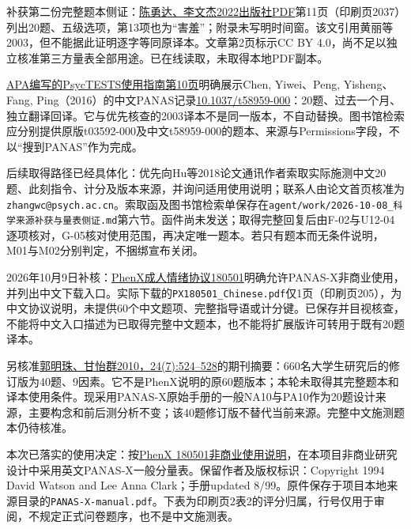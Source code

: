 \documentclass[11pt,a4paper]{article}
\begin{document}
补获第二份完整题本侧证：\href{https://pdf.hanspub.org/ap20220600000_21602996.pdf}{陈勇达、李文杰2022出版社PDF}第11页（印刷页2037）列出20题、五级选项，第13项也为“害羞”；附录未写明时间窗。该文引用黄丽等2003，但不能据此证明逐字等同原译本。文章第2页标示CC BY 4.0，尚不足以独立核准第三方量表全部用途。已在线读取，未取得本地PDF副本。

\href{https://fieldinglibrary.wordpress.com/wp-content/uploads/2014/09/psyctests-on-psycnet.pdf}{APA编写的PsycTESTS使用指南第10页}明确展示Chen, Yiwei、Peng, Yisheng、Fang, Ping（2016）的中文PANAS记录\href{https://doi.org/10.1037/t58959-000}{10.1037/t58959-000}：20题、过去一个月、独立翻译回译。它与优先核查的2003译本不是同一版本，不自动替换。图书馆检索应分别提供原版t03592-000及中文t58959-000的题本、来源与Permissions字段，不以“搜到PANAS”作为完成。

后续取得路径已经具体化：优先向Hu等2018论文通讯作者索取实际施测中文20题、此刻指令、计分及版本来源，并询问适用使用说明；联系人由论文首页核准为\texttt{zhangwc@psych.ac.cn}。索取函及图书馆检索单保存在\texttt{agent/work/2026-10-08\_科学来源补获与量表侧证.md}第六节。函件尚未发送；取得完整回复后由F-02与U12-04逐项核对，G-05核对使用范围，再决定唯一题本。若只有题本而无条件说明，M01与M02分别判定，不捆绑宣布关闭。

2026年10月9日补核：\href{https://www.phenxtoolkit.org/protocols/view/180501}{PhenX成人情绪协议180501}明确允许PANAS-X非商业使用，并列出中文下载入口。实际下载的\texttt{PX180501\_Chinese.pdf}仅1页（印刷页205），为中文协议说明，未提供60个中文题项、完整指导语或计分键。已保存并目视核查，不能将中文入口描述为已取得完整中文题本，也不能将扩展版许可转用于既有20题译本。

另核准\href{https://zxws.cbpt.cnki.net/portal/journal/portal/client/paper/3a515b38b5ea9848b85c2a7b8cb00a99}{郭明珠、甘怡群2010，24(7):524--528}的期刊摘要：660名大学生研究后的修订版为40题、9因素。它不是PhenX说明的原60题版本；本轮未取得其完整题本和译本使用条件。现采用PANAS-X原始手册的一般NA10与PA10作为20题设计来源，主要构念和前后测分析不变；该40题修订版不替代当前来源。完整中文施测题本仍待核准。

本次已落实的使用决定：按\href{https://www.phenxtoolkit.org/protocols/view/180501}{PhenX 180501非商业使用说明}，在本项目非商业研究设计中采用英文PANAS-X一般分量表。保留作者及版权标识：Copyright 1994 David Watson and Lee Anna Clark；手册updated 8/99。原件保存于项目本地来源目录的\texttt{PANAS-X-manual.pdf}。下表为印刷页2表2的评分归属，行号仅用于审阅，不规定正式问卷题序，也不是中文施测表。
\end{document}

